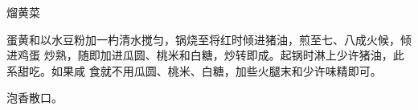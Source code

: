 \begin{recipe}{熘黄菜}

\ingredients


\preparation

蛋黄和以水豆粉加一杓清水搅匀，锅烧至将红时倾进猪油，煎至七、八成火候，倾进鸡蛋
炒熟，随即加进瓜圆、桃米和白糖，炒转即成。起锅时淋上少许猪油，此系甜吃。如果咸
食就不用瓜圆、桃米、白糖，加些火腿末和少许味精即可。

\features

泡香散口。

\end{recipe}

